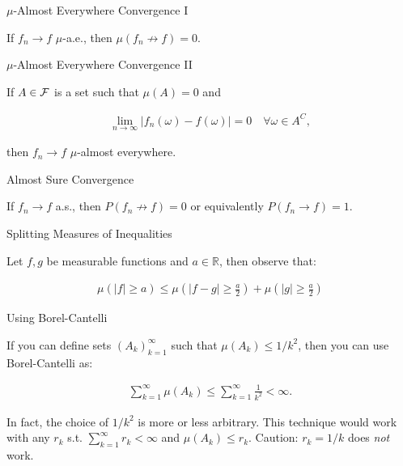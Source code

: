\begin{observation}{}{$\mu$-Almost Everywhere Convergence I}

    If $f_n \to f$ $\mu$-a.e., then $\mu(f_n \not\to f) = 0$.

\end{observation}

\begin{observation}{}{$\mu$-Almost Everywhere Convergence II}

    If $A \in \mathcal{F}$ is a set such that $\mu(A) = 0$ and

        \begin{align*}
            \lim_{n \to \infty} |f_n(\omega) - f(\omega)| = 0 \quad \forall \omega \in A^C,
        \end{align*}

    then $f_n \to f$ $\mu$-almost everywhere.

\end{observation}

\begin{observation}{}{Almost Sure Convergence}

    If $f_n \to f$ a.s., then $P(f_n \not\to f) = 0$ or equivalently $P(f_n \to f) = 1$.

\end{observation}

\begin{observation}{}{Splitting Measures of Inequalities}

    Let $f,g$ be measurable functions and $a \in \mathbb{R}$, then observe that:

        \begin{align*}
            \mu(|f| \geq a) \leq \mu\left( |f - g| \geq \frac{a}{2} \right) + \mu\left( |g| \geq \frac{a}{2} \right)
        \end{align*}

\end{observation}

\begin{observation}{}{Using Borel-Cantelli}

    If you can define sets $(A_k)_{k=1}^{\infty}$ such that $\mu(A_k) \leq 1/k^2$, then you can use Borel-Cantelli as:

        \begin{align*}
            \sum_{k=1}^{\infty} \mu(A_k) \leq \sum_{k=1}^{\infty} \frac{1}{k^2} < \infty.
        \end{align*}

    In fact, the choice of $1/k^2$ is more or less arbitrary. This technique would work with any $r_k$ s.t. $\sum_{k=1}^{\infty} r_k < \infty$ and $\mu(A_k) \leq r_k$. Caution: $r_k = 1/k$ does \emph{not} work.

\end{observation}

